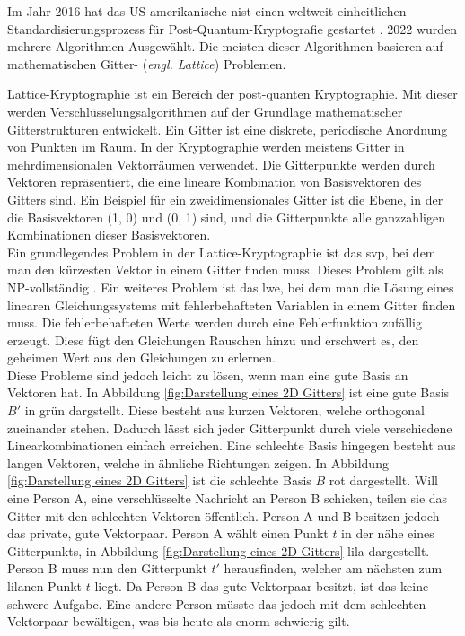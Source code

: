 Im Jahr 2016 hat das US-amerikanische \ac{nist} einen weltweit einheitlichen Standardisierungsprozess für Post-Quantum-Kryptografie gestartet \cite{moody_status_2022}.
2022 wurden mehrere Algorithmen Ausgewählt. Die meisten dieser Algorithmen basieren auf mathematischen Gitter- (\textit{engl. Lattice}) Problemen.

Lattice-Kryptographie \cite{micciancio_lattice-based_nodate} ist ein Bereich der post-quanten Kryptographie. 
Mit dieser werden Verschlüsselungsalgorithmen auf der Grundlage mathematischer Gitterstrukturen entwickelt. 
Ein Gitter ist eine diskrete, periodische Anordnung von Punkten im Raum. In der Kryptographie werden meistens Gitter in mehrdimensionalen Vektorräumen verwendet.
Die Gitterpunkte werden durch Vektoren repräsentiert, die eine lineare Kombination von Basisvektoren des Gitters sind. 
Ein Beispiel für ein zweidimensionales Gitter ist die Ebene, in der die Basisvektoren (1, 0) und (0, 1) sind, 
und die Gitterpunkte alle ganzzahligen Kombinationen dieser Basisvektoren.\\

Ein grundlegendes Problem in der Lattice-Kryptographie ist das \ac{svp}, bei dem man den kürzesten Vektor in einem Gitter finden muss. 
Dieses Problem gilt als NP-vollständig \cite[Abs. 2.1]{wang_lattice-based_2023}.
Ein weiteres Problem ist das \ac{lwe}, bei dem man die Lösung eines linearen Gleichungssystems mit fehlerbehafteten Variablen in einem Gitter finden muss.
Die fehlerbehafteten Werte werden durch eine Fehlerfunktion zufällig erzeugt. Diese fügt den Gleichungen Rauschen hinzu und erschwert es, den geheimen Wert aus den Gleichungen zu erlernen.\\

Diese Probleme sind jedoch leicht zu lösen, wenn man eine gute Basis an Vektoren hat. In Abbildung \ref{fig:Darstellung eines 2D Gitters} ist eine gute Basis $B'$ in grün dargstellt. Diese besteht aus kurzen Vektoren, welche orthogonal zueinander stehen. Dadurch lässt sich jeder Gitterpunkt durch viele verschiedene Linearkombinationen einfach erreichen. Eine schlechte Basis hingegen besteht aus langen Vektoren, welche in ähnliche Richtungen zeigen. In Abbildung \ref{fig:Darstellung eines 2D Gitters} ist die schlechte Basis $B$ rot dargestellt. Will eine Person A, eine verschlüsselte Nachricht an Person B schicken, teilen sie das Gitter mit den schlechten Vektoren öffentlich. Person A und B besitzen jedoch das private, gute Vektorpaar. Person A wählt einen Punkt $t$ in der nähe eines Gitterpunkts, in Abbildung \ref{fig:Darstellung eines 2D Gitters} lila dargestellt. Person B muss nun den Gitterpunkt $t'$ herausfinden, welcher am nächsten zum lilanen Punkt $t$ liegt. Da Person B das gute Vektorpaar besitzt, ist das keine schwere Aufgabe. Eine andere Person müsste das jedoch mit dem schlechten Vektorpaar bewältigen, was bis heute als enorm schwierig gilt.

